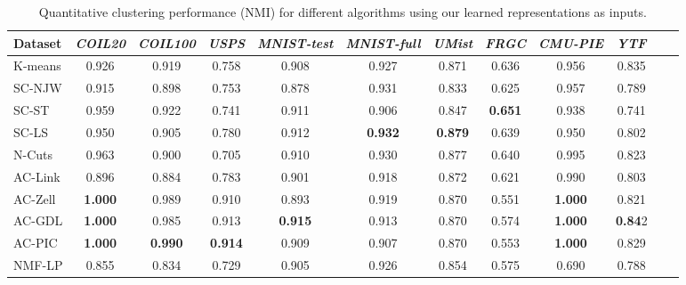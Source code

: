 \documentclass[10pt,twocolumn,letterpaper]{article}
\begin{document}
\begin{table*}[!ht]
\caption{{Quantitative clustering performance (NMI) for different algorithms using our learned representations as inputs.}}
\vspace{-15pt}
\center
\small
\begin{tabular}{lccccccccccc}
  \toprule
   Dataset & \textit{COIL20} & \textit{COIL100} & \textit{USPS} & \textit{MNIST-test} & \textit{MNIST-full} & \textit{UMist} & \textit{FRGC} & \textit{CMU-PIE} & \textit{YTF} \\   
  \midrule
  K-means \cite{macqueen1967some}  &0.926 &0.919 &0.758 &0.908 &0.927 &0.871 &0.636 &0.956       &0.835 \\
  
  SC-NJW \cite{ng2002spectral}     &0.915 &0.898 &0.753 &0.878 &0.931 &0.833 &0.625 &0.957        &0.789 \\
      
  SC-ST \cite{zelnik2004self}      &0.959 &0.922 &0.741 &0.911 &0.906 &0.847 &\textbf{0.651} &0.938 &0.741 \\   
  
  SC-LS \cite{chen2011large}    &0.950 &0.905 &0.780 &0.912 &\textbf{0.932} &\textbf{0.879}       &0.639   & 0.950 &0.802 \\
  
  N-Cuts \cite{shi2000normalized}  &0.963 &0.900 &0.705 &0.910 &0.930 &0.877 &0.640 &0.995     &0.823   \\
  
  AC-Link \cite{jain1999data}      &0.896 &0.884 &0.783 &0.901 &0.918 &0.872 &0.621 &0.990  &{0.803} \\
    
  AC-Zell \cite{zhao2009cyclizing} &\textbf{1.000} &0.989 &0.910 &0.893 &0.919 &0.870 &0.551 &\textbf{1.000}  &0.821  \\
  
  AC-GDL \cite{zhang2012graph}     &\textbf{1.000} &0.985 &0.913 &\textbf{0.915} &0.913  & 0.870 &0.574 &\textbf{1.000} &\textbf{0.84}2  \\   
  
  AC-PIC \cite{zhang2013agglomerative}   &\textbf{1.000} &\textbf{0.990} &\textbf{0.914} &0.909 &0.907  &0.870 &0.553  &\textbf{1.000}  &0.829 \\
  
  NMF-LP \cite{cai2009locality}    &0.855  &0.834 &0.729 &0.905 &0.926 & 0.854    & 0.575      &0.690 &0.788 \\
  \bottomrule
\end{tabular}
\label{TB_Quantitative_Results_withRep}
\end{table*}
\end{document}
